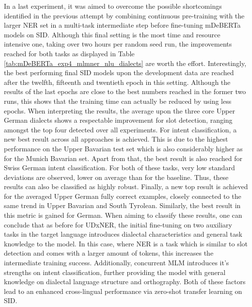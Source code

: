 \documentclass[11pt,a4paper,twoside,openright]{scrbook}
\begin{document}
In a last experiment, it was aimed to overcome the possible shortcomings identified in the previous attempt by combining continuous pre-training with the larger NER set in a multi-task intermediate step before fine-tuning mDeBERTa models on SID. Although this final setting is the most time and resource intensive one, taking over two hours per random seed run, the improvements reached for both tasks as displayed in Table \ref{tab:mDeBERTa_exp4_mlmner_nlu_dialects} are worth the effort. Interestingly, the best performing final SID models upon the development data are reached after the twelfth, fifteenth and twentieth epoch in this setting. Although the results of the last epochs are close to the best numbers reached in the former two runs, this shows that the training time can actually be reduced by using less epochs. When interpreting the results, the average upon the three core Upper German dialects shows a respectable improvement for slot detection, ranging amongst the top four detected over all experiments. For intent classification, a new best result across all approaches is achieved. This is due to the highest performance on the Upper Bavarian test set which is also considerably higher as for the Munich Bavarian set. Apart from that, the best result is also reached for Swiss German intent classification. For both of these tasks, very low standard deviations are observed, lower on average than for the baseline. Thus, these results can also be classified as highly robust. Finally, a new top result is achieved for the averaged Upper German fully correct examples, closely connected to the same trend in Upper Bavarian and South Tyrolean. Similarly, the best result in this metric is gained for German. When aiming to classify these results, one can conclude that as before for UDxNER, the initial fine-tuning on two auxiliary tasks in the target language introduces dialectal characteristics and general task knowledge to the model. In this case, where NER is a task which is similar to slot detection and comes with a larger amount of tokens, this increases the intermediate training success. Additionally, concurrent MLM introduces it's strengths on intent classification, further providing the model with general knowledge on dialectal language structure and orthography. Both of these factors lead to an enhanced cross-lingual performance via zero-shot transfer learning on SID.
\end{document}
